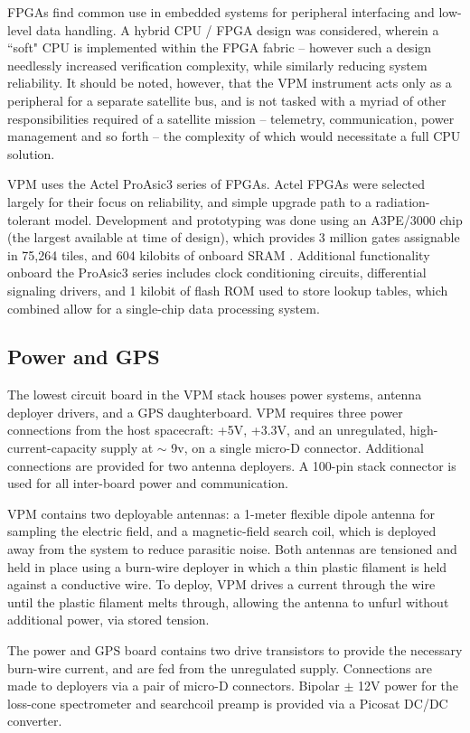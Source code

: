 FPGAs find common use in embedded systems for peripheral interfacing and low-level data handling. A hybrid CPU / FPGA design was considered, wherein a ``soft" CPU is implemented within the FPGA fabric -- however such a design needlessly increased verification complexity, while similarly reducing system reliability. It should be noted, however, that the VPM instrument acts only as a peripheral for a separate satellite bus, and is not tasked with a myriad of other responsibilities required of a satellite mission -- telemetry, communication, power management and so forth -- the complexity of which would necessitate a full CPU solution.

VPM uses the Actel ProAsic3 series of FPGAs. Actel FPGAs were selected largely for their focus on reliability, and simple upgrade path to a radiation-tolerant model. Development and prototyping was done using an A3PE/3000 chip (the largest available at time of design), which provides 3 million gates assignable in 75,264 tiles, and 604 kilobits of onboard SRAM . Additional functionality onboard the ProAsic3 series includes clock conditioning circuits, differential signaling drivers, and 1 kilobit of flash ROM used to store lookup tables, which combined allow for a single-chip data processing system. %


\subsection{Power and GPS}
The lowest circuit board in the VPM stack houses power systems, antenna deployer drivers, and a GPS daughterboard. VPM requires three power connections from the host spacecraft: +5V, +3.3V, and an unregulated, high-current-capacity supply at $\sim$ 9v, on a single micro-D connector. Additional connections are provided for two antenna deployers. A 100-pin stack connector is used for all inter-board power and communication.

VPM contains two deployable antennas: a 1-meter flexible dipole antenna for sampling the electric field, and a magnetic-field search coil, which is deployed away from the system to reduce parasitic noise. Both antennas are tensioned and held in place using a burn-wire deployer in which a thin plastic filament is held against a conductive wire. To deploy, VPM drives a current through the wire until the plastic filament melts through, allowing the antenna to unfurl without additional power, via stored tension.

The power and GPS board contains two drive transistors to provide the necessary burn-wire current, and are fed from the unregulated supply. Connections are made to deployers via a pair of micro-D connectors. Bipolar $\pm$ 12V power for the loss-cone spectrometer and searchcoil preamp is provided via a Picosat DC/DC converter. %

